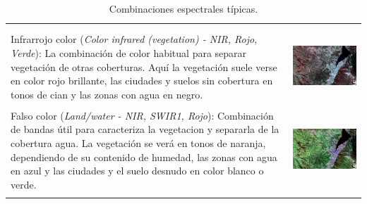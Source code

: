 \documentclass[a4paper,12pt]{book}
\begin{document}
\begin{table}[H]
\begin{tabular}{m{} c}
\begin{minipage}{.4\textwidth}
        \end{minipage}\\
        &\\
        Infrarrojo color (\emph{Color infrared (vegetation) - NIR, Rojo, Verde}): La combinación de color habitual para separar vegetación de otras coberturas. Aquí la vegetación suele verse en color rojo brillante, las ciudades y suelos sin cobertura en tonos de cian y las zonas con agua en negro. &
        \begin{minipage}{.4\textwidth} \includegraphics[width=\linewidth]{8-4-3.jpeg}
        \end{minipage}\\
        &\\
        Falso color (\emph{Land/water - NIR, SWIR1, Rojo}): Combinación de bandas útil para caracteriza la vegetacion y separarla de la cobertura agua. La vegetación se verá en tonos de naranja, dependiendo de su contenido de humedad, las zonas con agua en azul y las ciudades y el suelo desnudo en  color blanco o verde. &
        \begin{minipage}{.4\textwidth} \includegraphics[width=\linewidth]{8-11-4.jpeg}
        \end{minipage}\\
        &\\
        \bottomrule
    \end{tabular}
    \caption{Combinaciones espectrales típicas.}
    \label{tab:ce}
\end{table}
\vfill
\hspace{0pt}
\end{document}
